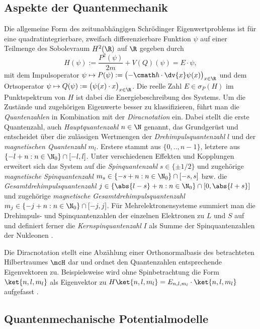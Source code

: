 \documentclass[../main.tex]{subfiles}
\begin{document}
    \subsection{Aspekte der Quantenmechanik}
        Die allgemeine Form des zeitunabhängigen Schrödinger Eigenwertproblems ist für eine quadratintegrierbare, zweifach differenzierbare Funktion $\psi$ auf einer Teilmenge des Sobolevraum $H^2(\R)$ auf $\R$ gegeben durch
        \[
            H(\psi) := \frac{P^2(\psi)}{2m} + V(Q)(\psi) = E\cdot\psi,
        \]
        mit dem Impulsoperator $\psi\mapsto P(\psi):=\bigl(-\cmath\hbar\cdot\dv{x}\psi(x)\bigr)_{x\in\R}$ und dem Ortsoperator $\psi\mapsto Q(\psi):=\bigl(\psi(x)\cdot x\bigr)_{x\in\R}$. Die reelle Zahl $E\in\sigma_P(H)$ im Punktspektrum von $H$ ist dabei die Energiebeschreibung des Systems. Um die Zustände und zugehörigen Eigenwerte besser zu klassifizieren, führt man die \emph{Quantenzahlen} in Kombination mit der \emph{Diracnotation} ein. Dabei stellt die erste Quantenzahl, auch \emph{Hauptquantenzahl} $n\in\N$ genannt, das Grundgerüst und entscheidet über die zulässigen Wertmengen der \emph{Drehimpulsquantenzahl} $l$ und der \emph{magnetischen Quantenzahl} $m_l$. Erstere stammt aus $\{0,..,n-1\}$, letztere aus $\{-l + n:n\in\N_0\}\cap[-l,l]$. Unter verschiedenen Effekten und Kopplungen erweitert sich das System auf die \emph{Spinquantenzahl} $s\in\{\pm 1/2\}$ und zugehörige \emph{magnetische Spinquantenzahl} $m_s\in\{-s + n:n\in\N_0\}\cap[-s,s]$ bzw. die \emph{Gesamtdrehimpulsquantenzahl} $j\in\{\abs{l-s} + n:n\in\N_0\}\cap[0,\abs{l+s}]$ und zugehörige \emph{magnetische Gesamtdrehimpulsquantenzahl} $m_j\in\{-j + n:n\in\N_0\}\cap[-j,j]$. Für Mehrelektronensysteme summiert man die Drehimpuls- und Spinquantenzahlen der einzelnen Elektronen zu $L$ und $S$ auf und definiert ferner die \emph{Kernspinquantenzahl} $I$ als Summe der Spinquantenzahlen der Nukleonen \cite{wiki:Quantenzahl}.

        Die Diracnotation stellt eine Abzählung einer Orthonormalbasis des betrachteten Hilbertraumes $\mcH$ dar und ordnet den Quantenzahlen entsprechende Eigenvektoren zu. Beispielsweise wird ohne Spinbetrachtung die Form $\ket{n,l,m_l}$ als Eigenvektor zu $H\ket{n,l,m_l} = E_{n,l,m_l}\cdot\ket{n,l,m_l}$ aufgefasst \cite[p.48f]{git:IK4T}.


    \subsection{Quantenmechanische Potentialmodelle}
\end{document}
